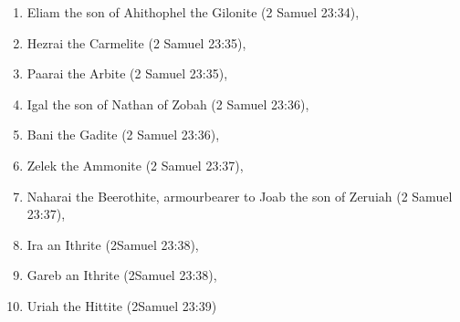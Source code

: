 \begin{enumerate}
\item Eliam the son of Ahithophel the Gilonite  (2 Samuel 23:34),
\item Hezrai the Carmelite (2 Samuel 23:35), 
\item Paarai the Arbite (2 Samuel 23:35),
\item Igal the son of Nathan of Zobah (2 Samuel 23:36), 
\item Bani the Gadite (2 Samuel 23:36),
\item Zelek the Ammonite (2 Samuel 23:37), 
\item Naharai the Beerothite, armourbearer to Joab the son of Zeruiah (2 Samuel 23:37), 
\item Ira an Ithrite (2Samuel 23:38), 
\item Gareb an Ithrite (2Samuel 23:38),
\item Uriah the Hittite (2Samuel 23:39)
\end{enumerate}


